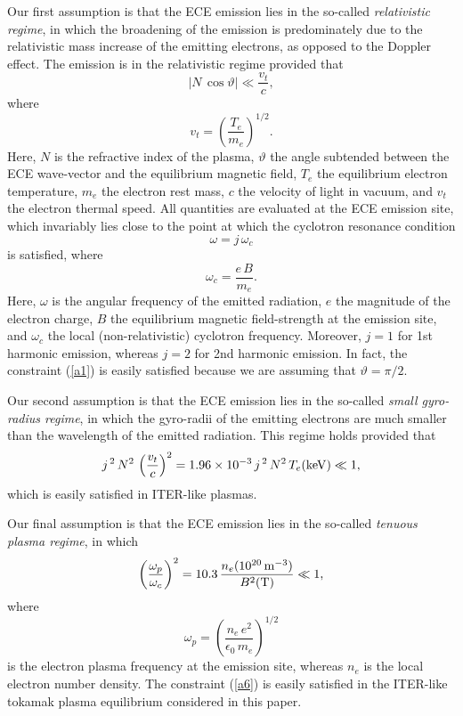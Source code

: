 \documentclass{iopjournal}
\begin{document}
Our first assumption is that the ECE emission lies in the so-called {\em relativistic regime}, in which the
broadening of the emission is predominately due to the relativistic mass increase of the emitting electrons, as opposed to the Doppler effect. The
emission is in the relativistic regime provided that
\begin{equation}\label{a1}
|N\,\cos\vartheta|  \ll \frac{v_t}{c},
\end{equation}
where
\begin{equation}
v_t = \left(\frac{T_e}{m_e}\right)^{1/2}.
\end{equation}
Here, $N$ is the refractive index of the plasma, $\vartheta$ the angle subtended between the ECE wave-vector and the equilibrium magnetic field, $T_e$ the equilibrium electron
temperature, $m_e$ the electron rest mass, $c$ the velocity of light in vacuum, and $v_t$ the electron thermal speed.  All quantities are evaluated at the ECE emission site, which invariably
lies 
close to the point at which the cyclotron resonance condition
\begin{equation}
\omega = j\,\omega_c
\end{equation}
is satisfied, 
where 
\begin{equation}
\omega_c = \frac{e\,B}{m_e}.
\end{equation}
Here, $\omega$ is the angular frequency of the emitted radiation, $e$ the magnitude of the electron charge, $B$ the equilibrium magnetic field-strength at the emission site, and $\omega_c$  the local (non-relativistic) cyclotron frequency. 
Moreover, $j=1$ for 1st harmonic emission, whereas $j=2$ for 2nd harmonic emission. In fact, the constraint (\ref{a1}) is easily satisfied because we are assuming that
$\vartheta=\pi/2$. 

Our second assumption is that the ECE emission lies in the so-called {\em small gyro-radius regime}, in which the gyro-radii of the emitting electrons are much smaller than
the wavelength of the emitted radiation. This regime holds provided that 
\begin{equation}
j^{\,2}\,N^2\,\left(\frac{v_t}{c}\right)^2 = 1.96\times 10^{-3}\,j^{\,2}\,N^2\,T_e({\rm keV}) \ll 1,
\end{equation}
which is easily satisfied in ITER-like plasmas. 

Our final assumption is that the ECE emission lies in the so-called {\em tenuous plasma regime}, in which
\begin{equation}\label{a6}
\left(\frac{\omega_p}{\omega_c}\right)^2 = 10.3\,\frac{n_e(10^{20}\,{\rm m}^{-3})}{B^2({\rm T})}\ll 1,
\end{equation}
where
\begin{equation}
\omega_p = \left(\frac{n_e\,e^2}{\epsilon_0\,m_e}\right)^{1/2}
\end{equation}
is the electron plasma frequency at the emission site, whereas $n_e$ is the local electron number density. The constraint (\ref{a6}) is
easily satisfied in the ITER-like tokamak plasma equilibrium considered in this paper. 
\end{document}
